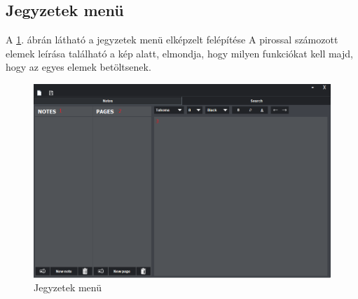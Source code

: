\subsection{Jegyzetek menü}

A \ref{fig:menu_notes}. ábrán látható a jegyzetek menü elképzelt felépítése A pirossal számozott elemek leírása található a kép alatt, elmondja, hogy milyen funkciókat kell majd, hogy az egyes elemek betöltsenek.

\begin{figure}[h]
	\centering
	\includegraphics[scale=0.5]{images/menu_2.png}
	\caption{Jegyzetek menü}
	\label{fig:menu_notes}
\end{figure}

